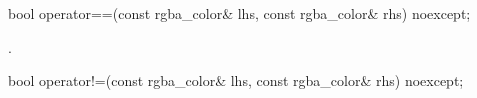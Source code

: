 \begin{itemdecl}
bool operator==(const rgba_color& lhs, const rgba_color& rhs) noexcept;
\end{itemdecl}
\begin{itemdescr}
\pnum
\returns
{}.
\end{itemdescr}

\begin{itemdecl}
bool operator!=(const rgba_color& lhs, const rgba_color& rhs) noexcept;
\end{itemdecl}
\begin{itemdescr}
\pnum
\returns
{}
\end{itemdescr}
